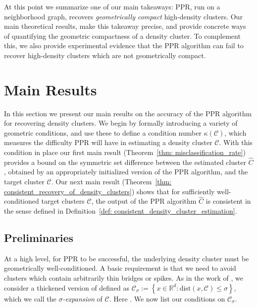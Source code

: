 \documentclass[11pt,twoside]{article}
\newcommand{\set}[1]{\left\{#1\right\}}
\newcommand{\Reals}{\mathbb{R}}
\newcommand{\norm}[1]{\left\lVert#1\right\rVert}
\newcommand{\1}{\mathbf{1}}
\newcommand{\dist}{\mathrm{dist}}
\newcommand{\Cbb}{\mathbb{C}}
\newcommand{\Cset}{\mathcal{C}}
\newcommand{\Csig}{\Cset_{\sigma}}
\newcommand{\Cest}{\widehat{C}}
\begin{document}
\noindent At this point we summarize one of our main takeaways: 
PPR, run on a neighborhood graph, recovers \emph{geometrically
compact} high-density clusters. Our main theoretical results, make this takeaway 
precise, and provide concrete ways of quantifying the geometric
compactness of a density cluster. To complement this, we also provide experimental
evidence that the PPR algorithm can fail to recover high-density clusters which are not
geometrically compact.

\section{Main Results}
\label{sec: consistent_cluster_estimation_with_ppr}
In this section we present our main results on the accuracy of the PPR algorithm 
for recovering density clusters. 
We begin by formally introducing a variety of geometric conditions, 
and use these to define a condition
number $\kappa(\Cset)$, which measures the difficulty PPR will have in  
estimating a density cluster $\Cset$.
With this condition in place 
our first main result (Theorem~\ref{thm: misclassification_rate}) provides a bound
on the symmetric set difference between the estimated cluster $\Cest$,
obtained by an appropriately initialized version of the PPR algorithm,
and
the target cluster $\Cset$.
Our next main result (Theorem~\ref{thm: consistent_recovery_of_density_clusters})
shows that for sufficiently well-conditioned target clusters $\Cset$, the output 
of the PPR algorithm $\Cest$
is consistent in the sense defined in Definition~\ref{def: consistent_density_cluster_estimation}.

\subsection{Preliminaries}%
At a high level, for PPR
to be successful, the underlying density cluster must be geometrically
well-conditioned.  A basic requirement is that we need to avoid clusters which contain arbitrarily
thin bridges or spikes. As in the work of \citet{chaudhuri2010}, we consider a
thickened version of \smash{$\Cset \in \Cbb_f(\lambda)$} defined as 
$\Csig := \set{x \in \Reals^d: \dist(x,\Cset) \leq \sigma}$, which 
we call the \emph{$\sigma$-expansion} of $\Cset$. Here 
\smash{$\dist(x,\Cset) := \inf_{y \in \Cset} \norm{y - x}$}.  We now list our
conditions on $\Csig$.
\end{document}
